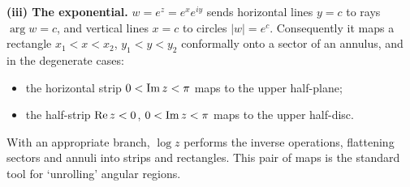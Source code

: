 \documentclass[a4paper]{scrartcl}
\begin{document}
\textbf{(iii) The exponential.} $w = e^z = e^x e^{iy}$ sends horizontal lines $y = c$ to rays $\arg w = c$, and vertical lines $x = c$ to circles $|w| = e^c$. Consequently it maps a rectangle $x_1 < x < x_2$, $y_1 < y < y_2$ conformally onto a sector of an annulus, and in the degenerate cases:
\begin{itemize}
	\item the horizontal strip $0 < \operatorname{Im} z < \pi$ maps to the upper half-plane;
	\item the half-strip $\operatorname{Re} z < 0$, $0 < \operatorname{Im} z < \pi$ maps to the upper half-disc.
\end{itemize}
\begin{center}
\end{center}
With an appropriate branch, $\log z$ performs the inverse operations, flattening sectors and annuli into strips and rectangles. This pair of maps is the standard tool for `unrolling' angular regions.
\end{document}
